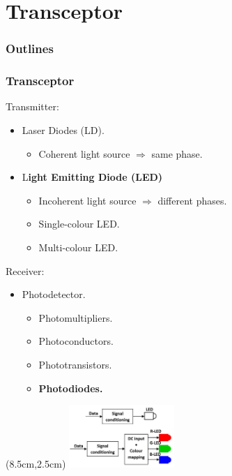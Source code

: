 \documentclass[mathserif]{beamer}
\newcommand{\wait}{\vfill}
\begin{document}
\section{Transceptor}
\begin{frame}
\frametitle{Outlines}
	\small
	\tableofcontents[currentsection]
\end{frame}
\begin{frame}
\frametitle{Transceptor}
	Transmitter:
	\begin{itemize}
		\item Laser Diodes (LD).
		\begin{itemize}
			\item Coherent light source $\Rightarrow$ same phase.
		\end{itemize}
		\item L\textbf{ight Emitting Diode (LED)}
		\begin{itemize}
			\item Incoherent light source $\Rightarrow$ different phases.
			\item Single-colour LED.
			\item Multi-colour LED.
		\end{itemize}
	\end{itemize}
	\wait
	
	Receiver:
	\begin{itemize}
		\item Photodetector.
		\begin{itemize}
			\item Photomultipliers.
			\item Photoconductors.
			\item Phototransistors.
			\item \textbf{Photodiodes.}
		\end{itemize}
	\end{itemize}

	\begin{textblock*}{4cm}(8.5cm,2.5cm) %
		\includegraphics[width=4cm]{figuras/led.png}
	\end{textblock*}


\end{frame}
\end{document}
